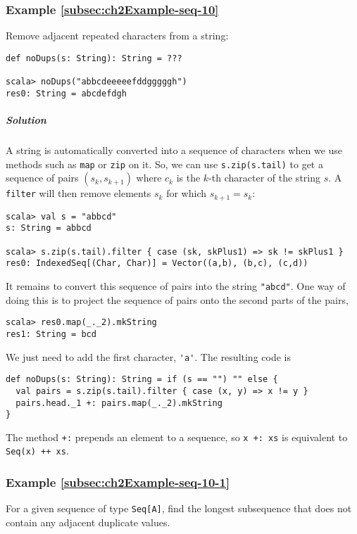 \subsubsection{Example \label{subsec:ch2Example-seq-10}\ref{subsec:ch2Example-seq-10}}

Remove adjacent repeated characters from a string:
\begin{lstlisting}
def noDups(s: String): String = ???

scala> noDups("abbcdeeeeefddgggggh")
res0: String = abcdefdgh
\end{lstlisting}


\subparagraph{Solution}

A string is automatically converted into a sequence of characters
when we use methods such as \lstinline!map! or \lstinline!zip! on
it. So, we can use \lstinline!s.zip(s.tail)! to get a sequence of
pairs $\left(s_{k},s_{k+1}\right)$ where $c_{k}$ is the $k$-th
character of the string $s$. A \lstinline!filter! will then remove
elements $s_{k}$ for which $s_{k+1}=s_{k}$:
\begin{lstlisting}
scala> val s = "abbcd"
s: String = abbcd

scala> s.zip(s.tail).filter { case (sk, skPlus1) => sk != skPlus1 }
res0: IndexedSeq[(Char, Char)] = Vector((a,b), (b,c), (c,d))
\end{lstlisting}
It remains to convert this sequence of pairs into the string \lstinline!"abcd"!.
One way of doing this is to project the sequence of pairs onto the
second parts of the pairs,
\begin{lstlisting}
scala> res0.map(_._2).mkString
res1: String = bcd
\end{lstlisting}
We just need to add the first character, \lstinline!'a'!. The resulting
code is
\begin{lstlisting}
def noDups(s: String): String = if (s == "") "" else {
  val pairs = s.zip(s.tail).filter { case (x, y) => x != y }
  pairs.head._1 +: pairs.map(_._2).mkString
}
\end{lstlisting}
The method \lstinline!+:! prepends an element to a sequence, so \lstinline!x +: xs!
is equivalent to \lstinline!Seq(x) ++ xs!.

\subsubsection{Example \label{subsec:ch2Example-seq-10-1}\ref{subsec:ch2Example-seq-10-1}}

For a given sequence of type \lstinline!Seq[A]!, find the longest
subsequence that does not contain any adjacent duplicate values.


